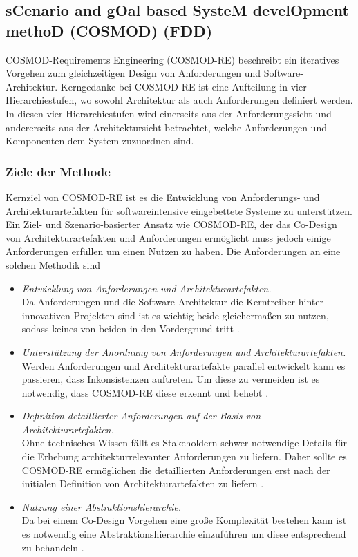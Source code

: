 \subsection{sCenario and gOal based SysteM develOpment methoD (COSMOD) (FDD)}\label{scgo}
COSMOD-Requirements Engineering (COSMOD-RE) beschreibt ein iteratives Vorgehen zum gleichzeitigen Design von Anforderungen und Software-Architektur. Kerngedanke bei COSMOD-RE ist eine Aufteilung in vier Hierarchiestufen, wo sowohl Architektur als auch Anforderungen definiert werden. In diesen vier Hierarchiestufen wird einerseits aus der Anforderungssicht und andererseits aus der Architektursicht betrachtet, welche Anforderungen und Komponenten dem System zuzuordnen sind.\\

\subsubsection{Ziele der Methode}
Kernziel von COSMOD-RE ist es die Entwicklung von Anforderungs- und Architekturartefakten für softwareintensive eingebettete Systeme zu unterstützen. Ein Ziel- und Szenario-basierter Ansatz wie COSMOD-RE, der das Co-Design von Architekturartefakten und Anforderungen ermöglicht muss jedoch einige Anforderungen erfüllen um einen Nutzen zu haben. Die Anforderungen an eine solchen Methodik sind \cite{Poh02}\\
 
\begin{itemize}
\item \emph{Entwicklung von Anforderungen und Architekturartefakten.} \\
Da Anforderungen und die Software Architektur die Kerntreiber hinter innovativen Projekten sind ist es wichtig beide gleichermaßen zu nutzen, sodass keines von beiden in den Vordergrund tritt \cite{Poh02}.
\item \emph{Unterstützung der Anordnung von Anforderungen und Architekturartefakten.} \\
Werden Anforderungen und Architekturartefakte parallel entwickelt kann es passieren, dass Inkonsistenzen auftreten. Um diese zu vermeiden ist es notwendig, dass COSMOD-RE diese erkennt und behebt \cite{Poh02}.
\item \emph{Definition detaillierter Anforderungen auf der Basis von Architekturartefakten.} \\
Ohne technisches Wissen fällt es Stakeholdern schwer notwendige Details für die Erhebung architekturrelevanter Anforderungen zu liefern. Daher sollte es COSMOD-RE ermöglichen die detaillierten Anforderungen erst nach der initialen Definition von Architekturartefakten zu liefern \cite{Poh02}. 
\item \emph{Nutzung einer Abstraktionshierarchie.} \\
Da bei einem Co-Design Vorgehen eine große Komplexität bestehen kann ist es notwendig eine Abstraktionshierarchie einzuführen um diese entsprechend zu behandeln \cite{Poh02}.\\
\end{itemize}

